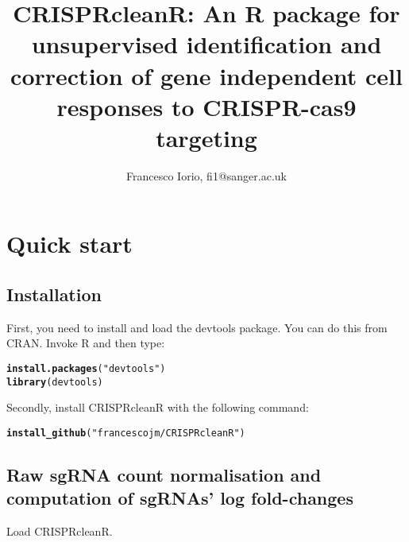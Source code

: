 \documentclass{article}\usepackage[]{graphicx}\usepackage[]{color}
\makeatletter
\newcommand{\hlstr}[1]{\textcolor[rgb]{0.192,0.494,0.8}{#1}}%
\newcommand{\hlstd}[1]{\textcolor[rgb]{0.345,0.345,0.345}{#1}}%
\newcommand{\hlkwd}[1]{\textcolor[rgb]{0.737,0.353,0.396}{\textbf{#1}}}%
\newenvironment{kframe}{%
 \def\at@end@of@kframe{}%
 \ifinner\ifhmode%
  \def\at@end@of@kframe{\end{minipage}}%
  \begin{minipage}{\columnwidth}%
 \fi\fi%
 \def\FrameCommand##1{\hskip\@totalleftmargin \hskip-\fboxsep
 \colorbox{shadecolor}{##1}\hskip-\fboxsep
     \hskip-\linewidth \hskip-\@totalleftmargin \hskip\columnwidth}%
 \MakeFramed {\advance\hsize-\width
   \@totalleftmargin\z@ \linewidth\hsize
   \@setminipage}}%
 {\par\unskip\endMakeFramed%
 \at@end@of@kframe}
\newenvironment{knitrout}{}{} %
\makeatother
\begin{document}
\title{CRISPRcleanR: An R package for unsupervised identification and correction of gene independent cell responses to CRISPR-cas9 targeting}
\author{Francesco Iorio, fi1@sanger.ac.uk}
\maketitle
\section{Quick start}

\subsection{Installation}

First, you need to install and load the devtools package. You can do this from CRAN. Invoke R and then type:

\begin{knitrout}
\color{fgcolor}\begin{kframe}
\begin{alltt}
\hlkwd{install.packages}\hlstd{(}\hlstr{"devtools"}\hlstd{)}
\hlkwd{library}\hlstd{(devtools)}
\end{alltt}
\end{kframe}
\end{knitrout}

Secondly, install CRISPRcleanR with the following command:

\begin{knitrout}
\color{fgcolor}\begin{kframe}
\begin{alltt}
\hlkwd{install_github}\hlstd{(}\hlstr{"francescojm/CRISPRcleanR"}\hlstd{)}
\end{alltt}
\end{kframe}
\end{knitrout}

\subsection{Raw sgRNA count normalisation and computation of sgRNAs' log fold-changes}

Load CRISPRcleanR.
\end{document}
